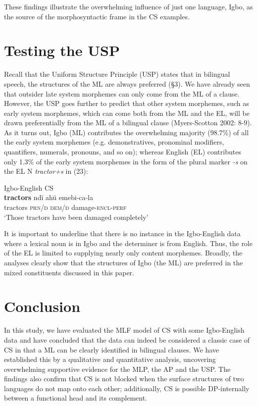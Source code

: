 \documentclass[output=paper]{langsci/langscibook}
\begin{document}
 

These findings illustrate the overwhelming influence of just one language, Igbo, as the source of the morphosyntactic frame in the CS examples. 

\section{Testing the USP}

Recall that the Uniform Structure Principle (USP) states that in bilingual speech, the structures of the ML are always preferred (§3). We have already seen that outsider late system morphemes can only come from the ML of a clause. However, the USP goes further to predict that other system morphemes, such as early system morphemes, which can come both from the ML and the EL, will be drawn preferentially from the ML of a bilingual clause (Myers-Scotton 2002: 8-9). As it turns out, Igbo (ML) contributes the overwhelming majority (98.7\%) of all the early system morphemes (e.g. demonstratives, pronominal modifiers, quantifiers, numerals, pronouns, and so on); whereas English (EL) contributes only 1.3\% of the early system morphemes in the form of the plural marker \textit{{}-s} on the EL N \textit{tractor+s }in (23): 

\ea
{Igbo-English CS}\\
\gll \textbf{tractors  }ndï    ahü  emebi-ca-la\\
     tractors  \textsc{prn/d}\textsubscript{    }\textsc{dem/d}  damage-\textsc{encl-perf}\textsubscript{ }\\
\glt ‘Those tractors have been damaged completely’
\z

It is important to underline that there is no instance in the Igbo-English data where a lexical noun is in Igbo and the determiner is from English. Thus, the role of the EL is limited to supplying nearly only content morphemes. Broadly, the analyses clearly show that the structures of Igbo (the ML) are preferred in the mixed constituents discussed in this paper.

\section{Conclusion}

In this study, we have evaluated the MLF model of CS with some Igbo-English data and have concluded that the data can indeed be considered a classic case of CS in that a ML can be clearly identified in bilingual clauses. We have established this by a qualitative and quantitative analysis, uncovering overwhelming supportive evidence for the MLP, the AP and the USP. The findings also confirm that CS is not blocked when the surface structures of two languages do not map onto each other; additionally, CS is possible DP-internally between a functional head and its complement. 
\end{document}
